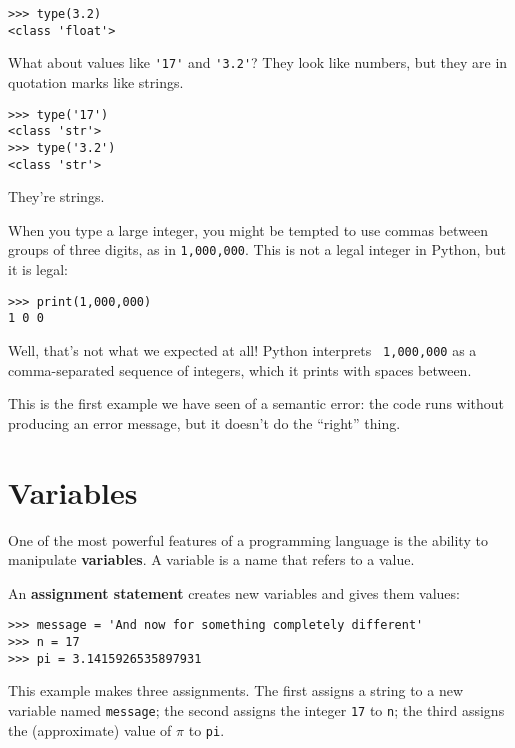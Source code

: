 \beforeverb
\begin{verbatim}
>>> type(3.2)
<class 'float'>
\end{verbatim}
\afterverb
%
What about values like \verb"'17'" and \verb"'3.2'"?
They look like numbers, but they are in quotation marks like
strings.


\beforeverb
\begin{verbatim}
>>> type('17')
<class 'str'>
>>> type('3.2')
<class 'str'>
\end{verbatim}
\afterverb
%
They're strings.

When you type a large integer, you might be tempted to use commas
between groups of three digits, as in {\tt 1,000,000}.  This is not a
legal integer in Python, but it is legal:

\beforeverb
\begin{verbatim}
>>> print(1,000,000)
1 0 0
\end{verbatim}
\afterverb
%
Well, that's not what we expected at all!  Python interprets {\tt
  1,000,000} as a comma-separated sequence of integers, which it
prints with spaces between.


This is the first example we have seen of a semantic error: the code
runs without producing an error message, but it doesn't do the
``right'' thing.


\section{Variables}

One of the most powerful features of a programming language is the
ability to manipulate {\bf variables}.  A variable is a name that
refers to a value.

An {\bf assignment statement} creates new variables and gives
them values:

\beforeverb
\begin{verbatim}
>>> message = 'And now for something completely different'
>>> n = 17
>>> pi = 3.1415926535897931
\end{verbatim}
\afterverb
%
This example makes three assignments.  The first assigns a string
to a new variable named {\tt message};
the second assigns the integer {\tt 17} to {\tt n}; the third
assigns the (approximate) value of $\pi$ to {\tt pi}.

